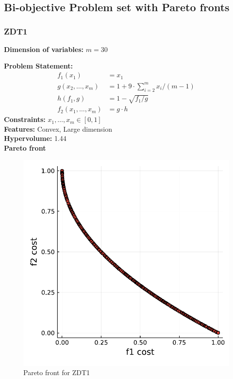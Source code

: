 \documentclass[11pt,oneside,onecolumn,openright]{article}
\begin{document}
\newpage
\subsection{Bi-objective Problem set with Pareto fronts}\label{sec:front}
  \subsubsection{ZDT1~\cite{huband2006review}}
  \textbf{Dimension of variables: }$m=30$

  \noindent\textbf{Problem Statement: }
  \begin{equation}
  \begin{aligned}
  f_{1}\left(x_{1}\right) & =x_{1} \\
  g\left(x_{2}, \ldots, x_{m}\right) & =1+9 \cdot \sum_{i=2}^{m} x_{i} /(m-1) \\
  h\left(f_{1}, g\right) & =1-\sqrt{f_{1} / g}\\
  f_2(x_{1}, \ldots, x_{m})&=g\cdot h
  \end{aligned}
  \end{equation}
  \noindent\textbf{Constraints: } $x_{1}, \ldots, x_{m}\in [0,1]$\\
  \noindent\textbf{Features: }Convex, Large dimension\\
  \noindent\textbf{Hypervolume: } 1.44\\
  \noindent\textbf{Pareto front}
      \begin{figure}[H]
      \centering
      \includegraphics[width=12cm]{fig/cvx1.pdf}
      \cprotect\caption{Pareto front for ZDT1}
      \label{fig:ZDT1}
      \end{figure}
\end{document}
